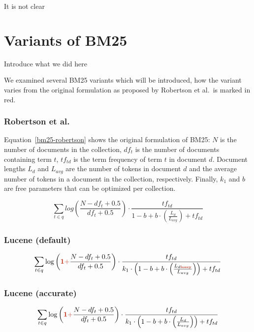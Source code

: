It is not clear 

\section{Variants of BM25}
Introduce what we did here

We examined several BM25 variants which will be introduced, how the variant varies from the original formulation as proposed by Robertson et al.~is marked in red. 

\subsubsection{Robertson et al.} 
Equation~\ref{bm25-robertson} shows the original formulation of BM25: $N$ is the number of documents in the collection, $df_t$ is the number of documents containing term $t$, $tf_{td}$ is the term frequency of term $t$ in document $d$. Document lengths $L_d$ and $L_{avg}$ are the number of tokens in document $d$ and the average number of tokens in a document in the collection, respectively. Finally, $k_1$ and $b$ are free parameters that can be optimized per collection. 

\begin{equation}
	\label{bm25-robertson}
	\sum_{t\in q} log\left(\frac{N-df_t+0.5}{df_t+0.5}\right)\cdot\frac{tf_{td}}{1-b+b\cdot\left(\frac{L_d}{L_{avg}}\right) + tf_{td}}
\end{equation}

\subsubsection{Lucene (default)}

\begin{equation}
	\sum_{t\in q}\log\left(\mathbf{\begingroup\color{ruhuisstijlrood}1 +\endgroup} \frac{N-df_t+0.5}{df_t+0.5}\right)\cdot\frac{tf_{td}}{k_1\cdot\left(1-b+b\cdot\left(\frac{L_{d \mathbf{\begingroup\color{ruhuisstijlrood}lossy\endgroup}}}{L_{avg}}\right)\right)+tf_{td}}
\end{equation}

\subsubsection{Lucene (accurate)}

\begin{equation}
	\sum_{t\in q}\log\left(\mathbf{\begingroup\color{ruhuisstijlrood}1 +\endgroup} \frac{N-df_t+0.5}{df_t+0.5}\right)\cdot\frac{tf_{td}}{k_1\cdot \left(1-b+b\cdot\left(\frac{L_d}{L_{avg}}\right)\right)+tf_{td}}
\end{equation}

